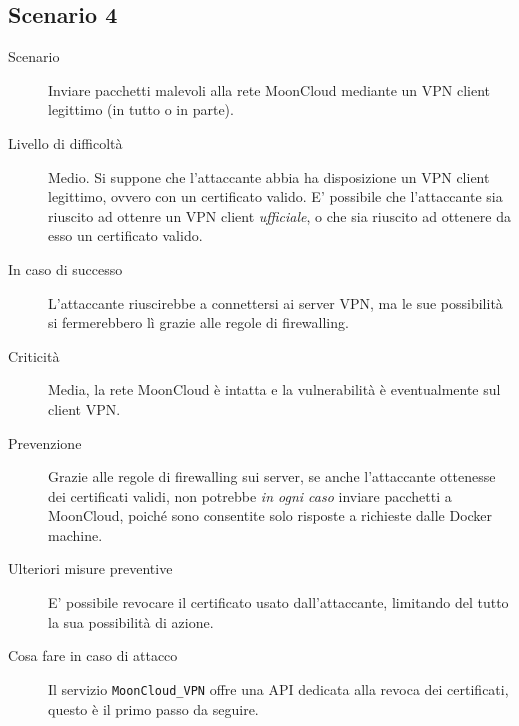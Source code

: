 \subsection{Scenario 4}
\begin{description}
    \item[Scenario]Inviare pacchetti malevoli alla rete MoonCloud
    mediante un VPN client legittimo (in tutto o in parte).
    \item[Livello di difficoltà]Medio. Si suppone che l'attaccante abbia
    ha disposizione un VPN client legittimo, ovvero con un certificato
    valido. E' possibile che l'attaccante sia riuscito ad ottenre un
    VPN client \textit{ufficiale}, o che sia riuscito ad ottenere
    da esso
    un certificato valido.
    \item[In caso di successo]L'attaccante riuscirebbe a connettersi
    ai server VPN, ma le sue possibilità si fermerebbero lì grazie
    alle regole di firewalling.
    \item[Criticità]Media, la rete MoonCloud è intatta e la vulnerabilità
    è eventualmente sul client VPN.
    \item[Prevenzione]Grazie alle regole di firewalling sui server,
    se anche l'attaccante ottenesse dei certificati validi, non
    potrebbe \textit{in ogni caso} inviare pacchetti a MoonCloud, poiché
    sono consentite solo risposte a richieste dalle Docker machine. 
    \item[Ulteriori misure preventive]E' possibile revocare il certificato
    usato dall'attaccante, limitando del tutto la sua possibilità di azione.
    \item[Cosa fare in caso di attacco]Il servizio  \texttt{MoonCloud\_VPN}
    offre una API dedicata alla revoca dei certificati, questo è il primo
    passo da seguire.
\end{description}

